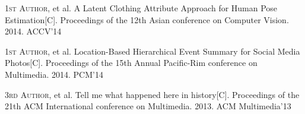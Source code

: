 
\begin{publications}{99}

    \item\textsc{1st Author}, et al. {A Latent Clothing Attribute Approach for Human Pose Estimation}[C].
      Proceedings of the 12th Asian conference on Computer Vision. 2014. ACCV'14

    \item\textsc{1st Author}, et al. {Location-Based Hierarchical Event Summary for Social Media Photos}[C].
      Proceedings of the 15th Annual Pacific-Rim conference on Multimedia. 2014. PCM'14

    \item\textsc{3rd Author}, et al. {Tell me what happened here in history}[C].
      Proceedings of the 21th ACM International conference on Multimedia. 2013. ACM Multimedia'13

\end{publications} 